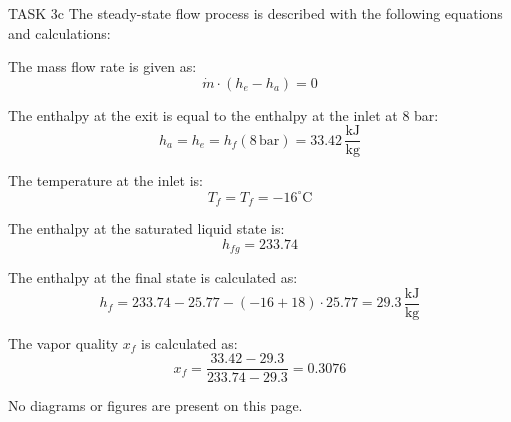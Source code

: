 TASK 3c  
The steady-state flow process is described with the following equations and calculations:  

The mass flow rate is given as:  
\[
\dot{m} \cdot (h_e - h_a) = 0
\]  

The enthalpy at the exit is equal to the enthalpy at the inlet at 8 bar:  
\[
h_a = h_e = h_f(8 \, \text{bar}) = 33.42 \, \frac{\text{kJ}}{\text{kg}}
\]  

The temperature at the inlet is:  
\[
T_f = T_f = -16^\circ\text{C}
\]  

The enthalpy at the saturated liquid state is:  
\[
h_{fg} = 233.74
\]  

The enthalpy at the final state is calculated as:  
\[
h_f = 233.74 - 25.77 - (-16 + 18) \cdot 25.77 = 29.3 \, \frac{\text{kJ}}{\text{kg}}
\]  

The vapor quality \( x_f \) is calculated as:  
\[
x_f = \frac{33.42 - 29.3}{233.74 - 29.3} = 0.3076
\]  

No diagrams or figures are present on this page.